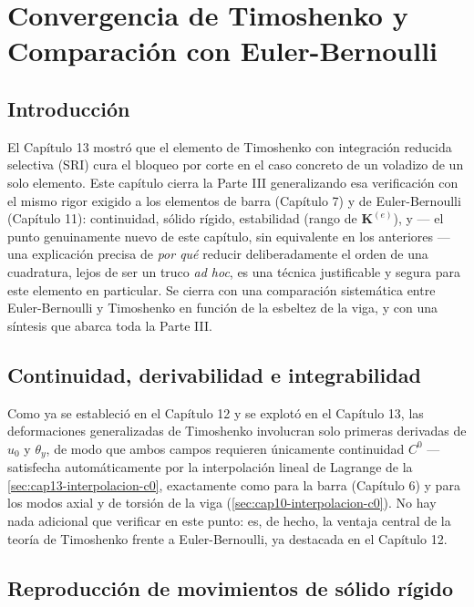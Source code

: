 \chapter{Convergencia de Timoshenko y Comparación con Euler-Bernoulli}
\label{chap:cap14-convergencia-timoshenko}

\section{Introducción}

El Capítulo 13 mostró que el elemento de Timoshenko con integración reducida selectiva (SRI) cura el bloqueo por corte en el caso concreto de un voladizo de un solo elemento. Este capítulo cierra la Parte III generalizando esa verificación con el mismo rigor exigido a los elementos de barra (Capítulo 7) y de Euler-Bernoulli (Capítulo 11): continuidad, sólido rígido, estabilidad (rango de $\bm K^{(e)}$), y --- el punto genuinamente nuevo de este capítulo, sin equivalente en los anteriores --- una explicación precisa de \emph{por qué} reducir deliberadamente el orden de una cuadratura, lejos de ser un truco \emph{ad hoc}, es una técnica justificable y segura para este elemento en particular. Se cierra con una comparación sistemática entre Euler-Bernoulli y Timoshenko en función de la esbeltez de la viga, y con una síntesis que abarca toda la Parte III.

\section{Continuidad, derivabilidad e integrabilidad}

Como ya se estableció en el Capítulo 12 y se explotó en el Capítulo 13, las deformaciones generalizadas de Timoshenko involucran solo primeras derivadas de $u_0$ y $\theta_y$, de modo que ambos campos requieren únicamente continuidad $C^0$ --- satisfecha automáticamente por la interpolación lineal de Lagrange de la \cref{sec:cap13-interpolacion-c0}, exactamente como para la barra (Capítulo 6) y para los modos axial y de torsión de la viga (\cref{sec:cap10-interpolacion-c0}). No hay nada adicional que verificar en este punto: es, de hecho, la ventaja central de la teoría de Timoshenko frente a Euler-Bernoulli, ya destacada en el Capítulo 12.

\section{Reproducción de movimientos de sólido rígido}
\label{sec:cap14-solido-rigido}

